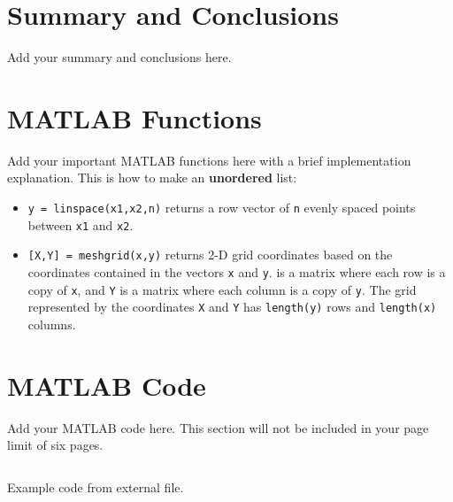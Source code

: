 \documentclass{article}
\begin{document}
\section{Summary and Conclusions}
Add your summary and conclusions here.

\printbibliography

\begin{appendices}

\section{MATLAB Functions}
Add your important MATLAB functions here with a brief implementation explanation. This is how to make an \textbf{unordered} list:
\begin{itemize}
    \item \texttt{y = linspace(x1,x2,n)} returns a row vector of \texttt{n} evenly spaced points between \texttt{x1} and \texttt{x2}.
    \item \texttt{[X,Y] = meshgrid(x,y)} returns 2-D grid coordinates based on the coordinates contained in the vectors \texttt{x} and \texttt{y}.  is a matrix where each row is a copy of \texttt{x}, and \texttt{Y} is a matrix where each column is a copy of \texttt{y}. The grid represented by the coordinates \texttt{X} and \texttt{Y} has \texttt{length(y)} rows and \texttt{length(x)} columns.
\end{itemize}

\section{MATLAB Code}
Add your MATLAB code here. This section will not be included in your page limit of six pages.

\begin{listing}[h]
\inputminted{matlab}{example.m}
\caption{Example code from external file.}
\label{listing:examplecode}
\end{listing}

\end{appendices}
\end{document}
